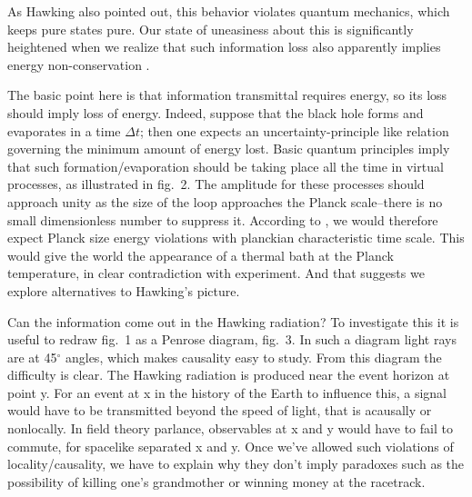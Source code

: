 As Hawking also pointed out, this behavior violates quantum mechanics,
which keeps pure states pure. Our state of
uneasiness about this is significantly
heightened when we realize that such information loss also apparently
implies energy non-conservation .


The basic point here is that information transmittal requires energy, so
its loss should imply loss of energy. Indeed, suppose that the black
hole forms and evaporates in a time ${\Delta}{t}$; then one expects an
uncertainty-principle like relation
%
\eqn{}
%
governing the minimum amount of energy lost. Basic quantum principles imply that such
formation/evaporation should be taking place all the time in virtual
processes, as illustrated in fig.~2. The amplitude for these processes
should approach unity as the size of the loop approaches the Planck
scale--there is no small dimensionless number to suppress it. According
to \eninfo, we would therefore expect Planck size energy violations
with planckian characteristic time scale. This would give the world the
appearance of a thermal bath at the Planck temperature, in clear
contradiction with experiment. And that suggests we explore
alternatives to Hawking's picture.


Can the information come out in the Hawking radiation? To investigate
this it is useful to redraw fig.~1 as a Penrose diagram, fig.~3. In such
a diagram light rays are at 45$^\circ$ angles, which makes causality
easy to study. From this diagram the difficulty is clear. The Hawking
radiation is produced near the event horizon at point y. For an event at
x in the history of the Earth to influence this, a signal would have to
be transmitted beyond the speed of light, that is acausally or
nonlocally. In field theory parlance, observables at x and y would have
to fail to commute,
%
\eqn{}
%
for spacelike separated x and y. Once we've allowed such violations of
locality/causality, we have to explain why they don't imply
paradoxes such as the possibility of
killing one's grandmother or winning money at the
racetrack.

